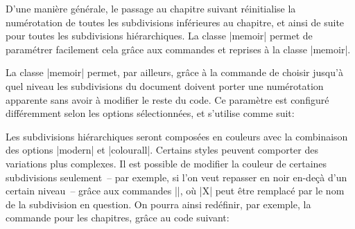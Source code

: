 \begin{developer}
D'une manière générale, le passage au chapitre suivant réinitialise la numérotation de toutes les subdivisions inférieures au chapitre, et ainsi de suite pour toutes les subdivisions hiérarchiques. La classe |memoir| permet de paramétrer facilement cela grâce aux commandes  et  reprises à la classe |memoir|.
\end{developer}

\begin{noprint}
\end{noprint}

La classe |memoir| permet, par ailleurs, grâce à la commande  de choisir jusqu'à quel niveau les subdivisions du document doivent porter une numérotation apparente sans avoir à modifier le reste du code. Ce paramètre est configuré différemment selon les options sélectionnées, et s'utilise comme suit:

\begin{macro}
\end{macro}

\begin{noprint}
\if@vitae
\else\if@didactic
\else
\fi\fi
\end{noprint}

Les subdivisions hiérarchiques seront composées en couleurs avec la combinaison des options |modern| et |colourall|. Certains styles peuvent comporter des variations plus complexes. Il est possible de modifier la couleur de certaines subdivisions seulement~-- par exemple, si l'on veut repasser en noir en-deçà d'un certain niveau~-- grâce aux commandes |\Xcolour|, où |X| peut être remplacé par le nom de la subdivision en question. On pourra ainsi redéfinir, par exemple, la commande pour les chapitres, grâce au code suivant:

